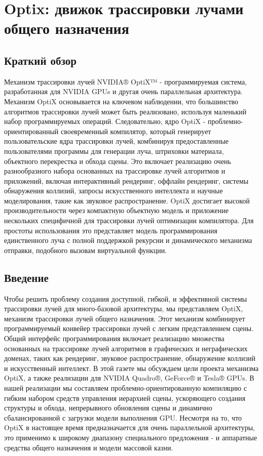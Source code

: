 \section{Optix: движок трассировки лучами общего назначения}
\subsection{Краткий обзор}
Механизм трассировки лучей NVIDIA® OptiX™ - программируемая система, разработанная для NVIDIA GPUs и другая очень параллельная архитектура.
Механизм OptiX основывается на ключевом наблюдении, что большинство алгоритмов трассировки лучей может быть реализовано, используя маленький набор программируемых операций. Следовательно, ядро OptiX - проблемно-ориентированный своевременный компилятор, который генерирует пользовательские ядра трассировки лучей, комбинируя предоставленные пользователями программы для генерации луча, штриховки материала, объектного перекрестка и обхода сцены. Это включает реализацию очень разнообразного набора основанных на трассировке лучей алгоритмов и приложений, включая интерактивный рендеринг, оффлайн рендеринг, системы обнаружения коллизий, запросы искусственного интеллекта и научные моделирования, такие как звуковое распространение. OptiX достигает высокой производительности через компактную объектную модель и приложение нескольких специфичной для трассировки лучей оптимизации компилятора. Для простоты использования это представляет модель программирования единственного луча с полной поддержкой рекурсии и динамического механизма отправки, подобного вызовам виртуальной функции.

\subsection{Введение}
Чтобы решить проблему создания доступной, гибкой, и эффективной системы трассировки лучей для много-базовой архитектуры, мы представляем OptiX, механизм трассировки лучей общего назначения. Этот механизм комбинирует программируемый конвейер трассировки лучей с легким представлением сцены. Общий интерфейс программирования включает реализацию множества основанных на трассировке лучей алгоритмов в графических и неграфических доменах, таких как рендеринг, звуковое распространение, обнаружение коллизий и искусственный интеллект.
В этой газете мы обсуждаем цели проекта механизма OptiX, а также реализации для NVIDIA Quadro®, GeForce® и Tesla® GPUs. В нашей реализации мы составляем проблемно-ориентированную компиляцию с гибким набором средств управления иерархией сцены, ускоряющего создания структуры и обхода, непрерывного обновления сцены и динамично сбалансированной с загрузки модели выполнения GPU. Несмотря на то, что OptiX в настоящее время предназначается для очень параллельной архитектуры, это применимо к широкому диапазону специального предложения - и аппаратные средства общего назначения и модели массовой казни.

